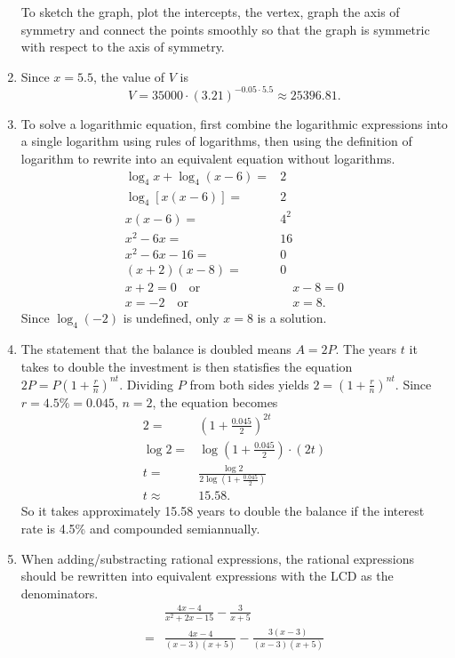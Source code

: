 \documentclass[
  12pt]{article}
\begin{document}
\begin{enumerate}
  To sketch the graph, plot the intercepts, the vertex, graph the axis
  of symmetry and connect the points smoothly so that the graph is
  symmetric with respect to the axis of symmetry.
\item
  Since \(x=5.5\), the value of \(V\) is \[
  V=35000\cdot (3.21)^{-0.05\cdot 5.5}\approx 25396.81.
  \]
\item
  To solve a logarithmic equation, first combine the logarithmic
  expressions into a single logarithm using rules of logarithms, then
  using the definition of logarithm to rewrite into an equivalent
  equation without logarithms. \[
  \begin{aligned}
  \log_4x+\log_4(x-6)=&2\\
  \log_4[x(x-6)]=&2\\
  x(x-6)=&4^2\\
  x^2-6x=&16\\
  x^2-6x-16=&0\\
  (x+2)(x-8)=&0\\
  x+2=0\quad\text{or}&\quad x-8=0\\
  x=-2\quad\text{or}&\quad x=8.
  \end{aligned}
  \] Since \(\log_4(-2)\) is undefined, only \(x=8\) is a solution.
\item
  The statement that the balance is doubled means \(A=2P\). The years
  \(t\) it takes to double the investment is then statisfies the
  equation \(2P=P\left(1+\frac{r}{n}\right)^{nt}\). Dividing \(P\) from
  both sides yields \(2=\left(1+\frac{r}{n}\right)^{nt}\). Since
  \(r=4.5\%=0.045\), \(n=2\), the equation becomes \[
  \begin{aligned}
  2=&\left(1+\frac{0.045}{2}\right)^{2t}\\
  \log 2=&\log\left(1+\frac{0.045}{2}\right)\cdot (2t)\\
  t=&\frac{\log 2}{2\log\left(1+\frac{0.045}{2}\right)}\\
  t\approx&15.58.
  \end{aligned}
  \] So it takes approximately 15.58 years to double the balance if the
  interest rate is 4.5\% and compounded semiannually.
\item
  When adding/substracting rational expressions, the rational
  expressions should be rewritten into equivalent expressions with the
  LCD as the denominators. \[
  \begin{aligned}
  &\frac{4x-4}{x^2+2x-15}-\frac{3}{x+5}\\
  =&\frac{4x-4}{(x-3)(x+5)}-\frac{3(x-3)}{(x-3)(x+5)}\\

\end{aligned}\]
\end{enumerate}
\end{document}
